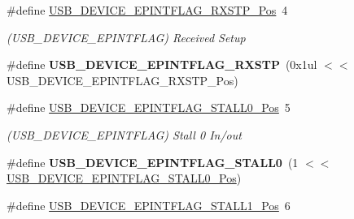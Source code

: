 \begin{DoxyCompactItemize}
\item 
\hypertarget{group___s_a_m_l21___u_s_b_ga87488ba5bcbc921ba71008b81b1cd3bb}{}\#define \hyperlink{group___s_a_m_l21___u_s_b_ga87488ba5bcbc921ba71008b81b1cd3bb}{U\+S\+B\+\_\+\+D\+E\+V\+I\+C\+E\+\_\+\+E\+P\+I\+N\+T\+F\+L\+A\+G\+\_\+\+R\+X\+S\+T\+P\+\_\+\+Pos}~4\label{group___s_a_m_l21___u_s_b_ga87488ba5bcbc921ba71008b81b1cd3bb}

\begin{DoxyCompactList}\small\item\em (U\+S\+B\+\_\+\+D\+E\+V\+I\+C\+E\+\_\+\+E\+P\+I\+N\+T\+F\+L\+A\+G) Received Setup \end{DoxyCompactList}\item 
\hypertarget{group___s_a_m_l21___u_s_b_ga7827670de342c0c0db4d2858e81f7eba}{}\#define {\bfseries U\+S\+B\+\_\+\+D\+E\+V\+I\+C\+E\+\_\+\+E\+P\+I\+N\+T\+F\+L\+A\+G\+\_\+\+R\+X\+S\+T\+P}~(0x1ul $<$$<$ U\+S\+B\+\_\+\+D\+E\+V\+I\+C\+E\+\_\+\+E\+P\+I\+N\+T\+F\+L\+A\+G\+\_\+\+R\+X\+S\+T\+P\+\_\+\+Pos)\label{group___s_a_m_l21___u_s_b_ga7827670de342c0c0db4d2858e81f7eba}

\item 
\hypertarget{group___s_a_m_l21___u_s_b_ga5f7a7c9eba59a7d7c7330575cbe4dd0b}{}\#define \hyperlink{group___s_a_m_l21___u_s_b_ga5f7a7c9eba59a7d7c7330575cbe4dd0b}{U\+S\+B\+\_\+\+D\+E\+V\+I\+C\+E\+\_\+\+E\+P\+I\+N\+T\+F\+L\+A\+G\+\_\+\+S\+T\+A\+L\+L0\+\_\+\+Pos}~5\label{group___s_a_m_l21___u_s_b_ga5f7a7c9eba59a7d7c7330575cbe4dd0b}

\begin{DoxyCompactList}\small\item\em (U\+S\+B\+\_\+\+D\+E\+V\+I\+C\+E\+\_\+\+E\+P\+I\+N\+T\+F\+L\+A\+G) Stall 0 In/out \end{DoxyCompactList}\item 
\hypertarget{group___s_a_m_l21___u_s_b_ga61e7e91f2a357c6404f5d1447b3084e8}{}\#define {\bfseries U\+S\+B\+\_\+\+D\+E\+V\+I\+C\+E\+\_\+\+E\+P\+I\+N\+T\+F\+L\+A\+G\+\_\+\+S\+T\+A\+L\+L0}~(1 $<$$<$ \hyperlink{group___s_a_m_l21___u_s_b_ga5f7a7c9eba59a7d7c7330575cbe4dd0b}{U\+S\+B\+\_\+\+D\+E\+V\+I\+C\+E\+\_\+\+E\+P\+I\+N\+T\+F\+L\+A\+G\+\_\+\+S\+T\+A\+L\+L0\+\_\+\+Pos})\label{group___s_a_m_l21___u_s_b_ga61e7e91f2a357c6404f5d1447b3084e8}

\item 
\hypertarget{group___s_a_m_l21___u_s_b_gab51a1b5c0bb0578d0b838456fece2269}{}\#define \hyperlink{group___s_a_m_l21___u_s_b_gab51a1b5c0bb0578d0b838456fece2269}{U\+S\+B\+\_\+\+D\+E\+V\+I\+C\+E\+\_\+\+E\+P\+I\+N\+T\+F\+L\+A\+G\+\_\+\+S\+T\+A\+L\+L1\+\_\+\+Pos}~6\label{group___s_a_m_l21___u_s_b_gab51a1b5c0bb0578d0b838456fece2269}


\end{DoxyCompactItemize}

